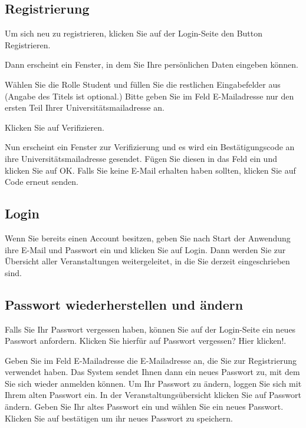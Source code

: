 \documentclass{Handbuch}
\begin{document}
\subsection{Registrierung}
Um sich neu zu registrieren, klicken Sie auf der Login-Seite den Button \frqq Registrieren\flqq{}. 
\begin{center}
\end{center}
Dann erscheint ein Fenster, in dem Sie Ihre persönlichen Daten eingeben können. 
\begin{center}
\end{center}
Wählen Sie die Rolle \glqq Student\grqq{} und füllen Sie die restlichen Eingabefelder aus (Angabe des Titels ist optional.) Bitte geben Sie im Feld \glqq E-Mailadresse\grqq{} nur den ersten Teil Ihrer Universitätsmailadresse an.
\begin{center}
\end{center}
Klicken Sie auf \frqq Verifizieren\flqq. 
\begin{center}
\end{center}
Nun erscheint ein Fenster zur Verifizierung und es wird ein Bestätigungscode an ihre Universitätsmailadresse gesendet. Fügen Sie diesen in das Feld ein und klicken Sie auf \frqq OK\flqq.
Falls Sie keine E-Mail erhalten haben sollten, klicken Sie auf \frqq Code erneut senden\flqq. 

\subsection{Login}
Wenn Sie bereits einen Account besitzen, geben Sie nach Start der Anwendung ihre E-Mail und Passwort ein und klicken Sie auf \frqq Login\flqq. Dann werden Sie zur Übersicht aller Veranstaltungen weitergeleitet, in die Sie derzeit eingeschrieben sind. 

\subsection{Passwort wiederherstellen und ändern}
\begin{center}
\end{center}
Falls Sie Ihr Passwort vergessen haben, können Sie auf der Login-Seite ein neues Passwort anfordern. Klicken Sie hierfür auf \frqq Passwort vergessen? Hier klicken!\flqq. 
\begin{center}
\end{center}
Geben Sie im Feld \glqq E-Mailadresse\grqq{} die E-Mailadresse an, die Sie zur Registrierung verwendet haben. Das System sendet Ihnen dann ein neues Passwort zu, mit dem Sie sich wieder anmelden können. 
Um Ihr Passwort zu ändern, loggen Sie sich mit Ihrem alten Passwort ein. In der Veranstaltungsübersicht klicken Sie auf \frqq Passwort ändern\flqq. Geben Sie Ihr altes Passwort ein und wählen Sie ein neues Passwort. Klicken Sie auf \frqq bestätigen\flqq{} um ihr neues Passwort zu speichern.
\end{document}
